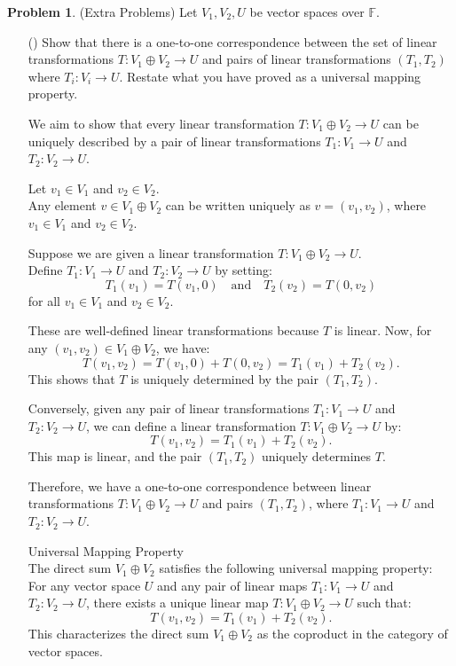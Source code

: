 \documentclass[12pt]{article}
\theoremstyle{definition}
\newtheorem{problem}{Problem}
\newcounter{subq}[problem]
\newenvironment{subproblem}
{\refstepcounter{subq} \begin{itemize} \item[(\alph{subq})]}
{\end{itemize} \medskip}
\begin{document}
\begin{problem} (Extra Problems)
    Let $V_1, V_2, U$ be vector spaces over $\mathbb{F}$.

    \begin{subproblem}
        Show that there is a one-to-one correspondence between the set of linear transformations $T:V_1 \oplus V_2 \rightarrow U$ and pairs of linear transformations
        $(T_1, T_2)$ where $T_i:V_i \rightarrow U$. Restate what you have proved as a universal mapping property.

        \begin{solution}
            We aim to show that every linear transformation \( T: V_1 \oplus V_2 \to U \) can be uniquely described by a pair of linear transformations \( T_1: V_1 \to U \) and \( T_2: V_2 \to U \).

            Let \( v_1 \in V_1 \) and \( v_2 \in V_2 \).\\
            Any element \( v \in V_1 \oplus V_2 \) can be written uniquely as \( v = (v_1, v_2) \), where \( v_1 \in V_1 \) and \( v_2 \in V_2 \).

            Suppose we are given a linear transformation \( T: V_1 \oplus V_2 \to U \).\\
            Define \( T_1: V_1 \to U \) and \( T_2: V_2 \to U \) by setting:
            \[
            T_1(v_1) = T(v_1, 0) \quad \text{and} \quad T_2(v_2) = T(0, v_2)
            \]
            for all \( v_1 \in V_1 \) and \( v_2 \in V_2 \).
            
            These are well-defined linear transformations because \( T \) is linear. Now, for any \( (v_1, v_2) \in V_1 \oplus V_2 \), we have:
            \[
            T(v_1, v_2) = T(v_1, 0) + T(0, v_2) = T_1(v_1) + T_2(v_2).
            \]
            This shows that \( T \) is uniquely determined by the pair \( (T_1, T_2) \).

            Conversely, given any pair of linear transformations \( T_1: V_1 \to U \) and \( T_2: V_2 \to U \), we can define a linear transformation \( T: V_1 \oplus V_2 \to U \) by:
            \[
            T(v_1, v_2) = T_1(v_1) + T_2(v_2).
            \]
            This map is linear, and the pair \( (T_1, T_2) \) uniquely determines \( T \).

            Therefore, we have a one-to-one correspondence between linear transformations \( T: V_1 \oplus V_2 \to U \) and pairs \( (T_1, T_2) \), where \( T_1: V_1 \to U \) and \( T_2: V_2 \to U \).

            Universal Mapping Property\\
            The direct sum \( V_1 \oplus V_2 \) satisfies the following universal mapping property:\\
            For any vector space \( U \) and any pair of linear maps \( T_1: V_1 \to U \) and \( T_2: V_2 \to U \), there exists a unique linear map \( T: V_1 \oplus V_2 \to U \) such that:
            \[
            T(v_1, v_2) = T_1(v_1) + T_2(v_2).
            \]
            This characterizes the direct sum \( V_1 \oplus V_2 \) as the coproduct in the category of vector spaces.
        

\end{solution}
\end{subproblem}
\end{problem}
\end{document}
